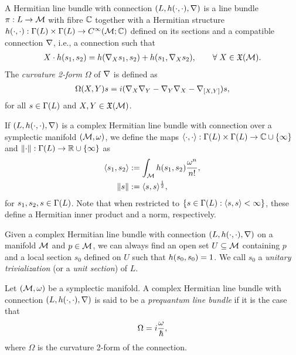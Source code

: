 \documentclass[notas.tex]{subfiles}
\begin{document}
\begin{defn}
	A Hermitian line bundle with connection $(L, h(\cdot,\cdot), \nabla)$ is a line bundle $\pi: L \to \mathcal{M}$ with fibre $\mathbb{C}$ together with a Hermitian structure $h(\cdot,\cdot): \Gamma(L) \times \Gamma(L) \to C^\infty(\mathcal{M}; \mathbb{C})$ defined on its sections  and a compatible connection $\nabla$, i.e., a connection such that
	\begin{align*}
		X \cdot \hip{s_1}{s_2} = \hip{\covd{X}s_1}{s_2} + \hip{s_1}{\covd{X}s_2}, \qquad \forall X \in \vf(\mfld).
	\end{align*}
The \emph{curvature 2-form} $\Omega$ of $\nabla$ is defined as
	\begin{align*}
		\Omega(X,Y)s = i(\nabla_{X}\nabla_{Y} - \nabla_{Y}\nabla_{X} - \nabla_{[X,Y]})s,
	\end{align*}
	for all $s \in \Gamma(L)$ and $X,Y \in \mathfrak{X}(\mathcal{M})$.
\end{defn}
If $(L, h(\cdot,\cdot), \nabla)$ is a complex Hermitian line bundle with connection over a symplectic manifold $(\mathcal{M}, \omega)$, we define the maps $\langle \cdot,\cdot \rangle: \Gamma(L) \times \Gamma(L) \to \mathbb{C} \cup \{\infty\}$ and $\left\lVert\cdot\right\rVert: \Gamma(L) \to \mathbb{R} \cup \{\infty\}$ as
\begin{align} \label{eq_hermitian_integral}
	\langle s_1,s_2 \rangle &:= \int_{\mathcal{M}} h(s_1,s_2)\frac{\omega^n}{n!},  \\
	\left\lVert s\right\rVert &:= \langle s,s \rangle^{\frac{1}{2}}, \nonumber
\end{align}
for $s_1, s_2, s \in \Gamma(L)$. Note that when restricted to $\{s \in \Gamma(L): \langle s,s \rangle < \infty \}$, these define a Hermitian inner product and a norm, respectively.
\begin{rem}\label{rem_local_isometric}
	Given a complex Hermitian line bundle with connection $(L, h(\cdot,\cdot), \nabla)$ on a manifold $\mathcal{M}$ and $p \in \mathcal{M}$, we can always find an open set $U \subseteq \mathcal{M}$ containing $p$ and a local section $s_0$ defined on $U$ such that $h(s_0,s_0) = 1$. We call $s_0$ a \emph{unitary trivialization} (or a \emph{unit section}) of $L$. 
\end{rem}
\begin{defn}
	Let $(\mathcal{M}, \omega)$ be a symplectic manifold. A complex Hermitian line bundle with connection $(L, h(\cdot,\cdot), \nabla)$ is said to be a \emph{prequantum line bundle} if it is the case that
	\begin{align*}
		\Omega = i\frac{\omega}{\hbar},
	\end{align*}
	where $\Omega$ is the curvature 2-form of the connection.
\end{defn}
\end{document}
